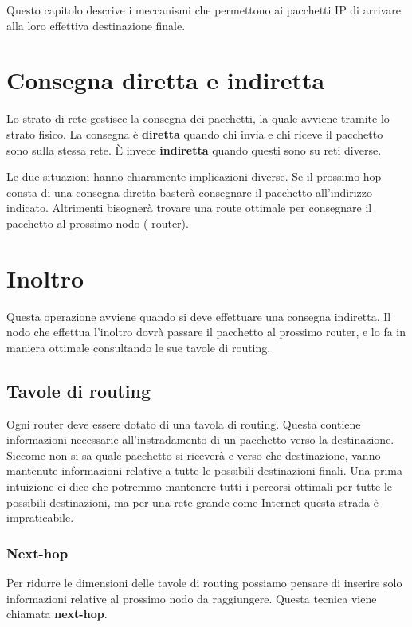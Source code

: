 Questo capitolo descrive i meccanismi che permettono ai pacchetti IP di arrivare alla loro effettiva destinazione finale.

\section{Consegna diretta e indiretta}
    Lo strato di rete gestisce la consegna dei pacchetti, la quale avviene tramite lo strato fisico. La consegna è \textbf{diretta} quando chi invia e chi riceve il pacchetto sono sulla stessa rete. È invece \textbf{indiretta} quando questi sono su reti diverse.
    
    Le due situazioni hanno chiaramente implicazioni diverse. Se il prossimo hop consta di una consegna diretta basterà consegnare il pacchetto all'indirizzo indicato. Altrimenti bisognerà trovare una route ottimale per consegnare il pacchetto al prossimo nodo (
    router).
    
\section{Inoltro}
    Questa operazione avviene quando si deve effettuare una consegna indiretta. Il nodo che effettua l'inoltro dovrà passare il pacchetto al prossimo router, e lo fa in maniera ottimale consultando le sue tavole di routing.
    
    \subsection{Tavole di routing}
        Ogni router deve essere dotato di una tavola di routing. Questa contiene informazioni necessarie all'instradamento di un pacchetto verso la destinazione. Siccome non si sa quale pacchetto si riceverà e verso che destinazione, vanno mantenute informazioni relative a tutte le possibili destinazioni finali. Una prima intuizione ci dice che potremmo mantenere tutti i percorsi ottimali per tutte le possibili destinazioni, ma per una rete grande come Internet questa strada è impraticabile.
        
        \subsubsection{Next-hop}
            Per ridurre le dimensioni delle tavole di routing possiamo pensare di inserire solo informazioni relative al prossimo nodo da raggiungere. Questa tecnica viene chiamata \textbf{next-hop}.
            
